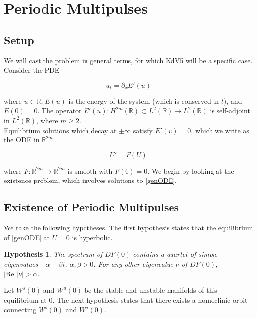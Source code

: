 \documentclass[12pt]{article}
\def\R{{\mathbb R}}
\newtheorem{hypothesis}{Hypothesis}
\begin{document}
\section{Periodic Multipulses}

\subsection{Setup}

We will cast the problem in general terms, for which KdV5 will be a specific case. Consider the PDE

\begin{equation}\label{genPDE}
u_t = \partial_x E'(u)
\end{equation}

where $u \in \R$, $E(u)$ is the energy of the system (which is conserved in $t$), and $E(0) = 0$. The operator $E'(u): H^{2m}(\R) \subset L^2(\R) \rightarrow L^2(\R)$ is self-adjoint in $L^2(\R)$, where $m \geq 2$.\\

Equilibrium solutions which decay at $\pm \infty$ satisfy $E'(u) = 0$, which we write as the ODE in $\R^{2m}$

\begin{equation}\label{genODE}
U' = F(U)
\end{equation}

where $F: \R^{2m} \rightarrow \R^{2m}$ is smooth with $F(0) = 0$. We begin by looking at the existence problem, which involves solutions to \eqref{genODE}.

\subsection{Existence of Periodic Multipulses}

We take the following hypotheses. The first hypothesis states that the equilibrium of \eqref{genODE} at $U = 0$ is hyperbolic. 

\begin{hypothesis}\label{hypeq}
The spectrum of $DF(0)$ contains a quartet of simple eigenvalues $\pm \alpha \pm \beta i$, $\alpha, \beta > 0$. For any other eigenvalue $\nu$ of $DF(0)$, $|\text{Re }|\nu| > \alpha$.
\end{hypothesis}

Let $W^s(0)$ and $W^u(0)$ be the stable and unstable manifolds of this equilibrium at 0. The next hypothesis states that there exists a homoclinic orbit connecting $W^s(0)$ and $W^u(0)$.
\end{document}
